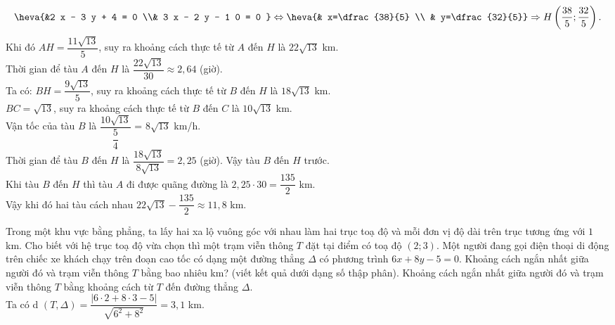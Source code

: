 \begin{bt}
{$$		\heva{&2 x - 3 y + 4 = 0  \\& 3 x - 2 y - 1 0 = 0 } \Leftrightarrow \heva{&	x=\dfrac{38}{5} \\	& y=\dfrac{32}{5}} \Rightarrow H\left(\dfrac{38}{5} ; \dfrac{32}{5}\right).$$
		Khi đó $A H=\dfrac{11 \sqrt{13}}{5}$, suy ra khoảng cách thực tế từ $A$ đến $H$ là $22 \sqrt{13}$ km.\\
		Thời gian để tàu $A$ đến $H$ là $\dfrac{22\sqrt{13}}{30}\approx 2,64$ (giờ).\\
		Ta có: $BH=\dfrac{9\sqrt{13}} 5$, suy ra khoảng cách thực tế từ $B$ đến $H$ là $18\sqrt{13}$ km.\\
		$BC=\sqrt{13}$, suy ra khoảng cách thực tế từ $B$ đến $C$ là $10\sqrt{13}$ km.\\
		Vận tốc của tàu $B$ là $\dfrac{10\sqrt{13}}{\dfrac{5}{4}}$ = $8\sqrt{13}$ km/h.\\
		Thời gian để tàu $B$ đến $H$ là $\dfrac{18\sqrt{13}}{8\sqrt{13}}=2,25$ (giờ).
		Vậy tàu $B$ đến $H$ trước.\\
		Khi tàu $B$ đến $H$ thì tàu $A$ đi được quãng đường là $2{,}25 \cdot30=\dfrac{135} {2}$ km.\\
		Vậy khi đó hai tàu cách nhau $22\sqrt{13}-\dfrac{135} {2}\approx 11{,}8$ km.
	}
\end{bt}

\begin{bt}%
	Trong một khu vực bằng phẳng, ta lấy hai xa lộ vuông góc với nhau làm hai trục toạ độ và mỗi đơn vị độ dài trên trục tương ứng với $1$ km. Cho biết với hệ trục toạ độ vừa chọn thì một trạm viễn thông $T$ đặt tại điểm có toạ độ $(2; 3)$. Một người đang gọi điện thoại di động trên chiếc xe khách chạy trên đoạn cao tốc có dạng một đường thẳng $\Delta $ có phương trình $6x+8y-5=0$. Khoảng cách ngắn nhất giữa người đó và trạm viễn thông $T$ bằng bao nhiêu km? (viết kết quả dưới dạng số thập phân).
	\loigiai
	{
		Khoảng cách ngắn nhất giữa người đó và trạm viễn thông $T$ bằng khoảng cách từ $T$ đến đường thẳng $\Delta $.\\
		Ta có d $(T,\Delta)=\dfrac{\left| 6\cdot 2+8\cdot 3-5 \right|}{\sqrt{6^2+8^2}}=3{,}1$ km. 	 
	}
\end{bt}

